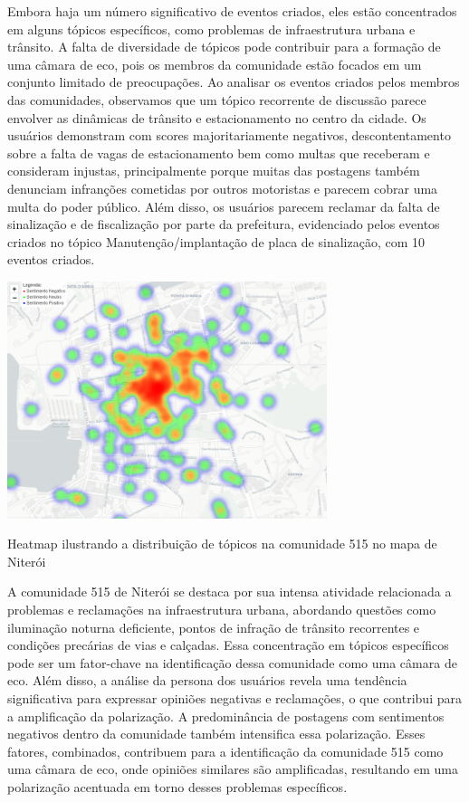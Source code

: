 Embora haja um número significativo de eventos criados, eles estão concentrados em alguns tópicos específicos, como problemas de infraestrutura urbana e trânsito. A falta de diversidade de tópicos pode contribuir para a formação de uma câmara de eco, pois os membros da comunidade estão focados em um conjunto limitado de preocupações. Ao analisar os eventos criados pelos membros das comunidades, observamos que um tópico recorrente de discussão parece envolver as dinâmicas de trânsito e estacionamento no centro da cidade. Os usuários demonstram com scores majoritariamente negativos, descontentamento sobre a falta de vagas de estacionamento bem como multas que receberam e consideram injustas, principalmente porque muitas das postagens também denunciam infranções cometidas por outros motoristas e parecem cobrar uma multa do poder público. Além disso, os usuários parecem reclamar da falta de sinalização e de fiscalização por parte da prefeitura, evidenciado pelos eventos criados no tópico Manutenção/implantação de placa de sinalização, com 10 eventos criados.

\begin{quadro}[htb]
	\centering
	\includegraphics[width=0.7\textwidth]{images/echo_chamber_niteroi_heatmap.PNG}
	\caption{Heatmap ilustrando a distribuição de tópicos na comunidade 515 no mapa de Niterói}
	\label{fig:echo_chamber_niteroi_heatmap}
\end{quadro}

A comunidade 515 de Niterói se destaca por sua intensa atividade relacionada a problemas e reclamações na infraestrutura urbana, abordando questões como iluminação noturna deficiente, pontos de infração de trânsito recorrentes e condições precárias de vias e calçadas. Essa concentração em tópicos específicos pode ser um fator-chave na identificação dessa comunidade como uma câmara de eco. Além disso, a análise da persona dos usuários revela uma tendência significativa para expressar opiniões negativas e reclamações, o que contribui para a amplificação da polarização. A predominância de postagens com sentimentos negativos dentro da comunidade também intensifica essa polarização. Esses fatores, combinados, contribuem para a identificação da comunidade 515 como uma câmara de eco, onde opiniões similares são amplificadas, resultando em uma polarização acentuada em torno desses problemas específicos.

